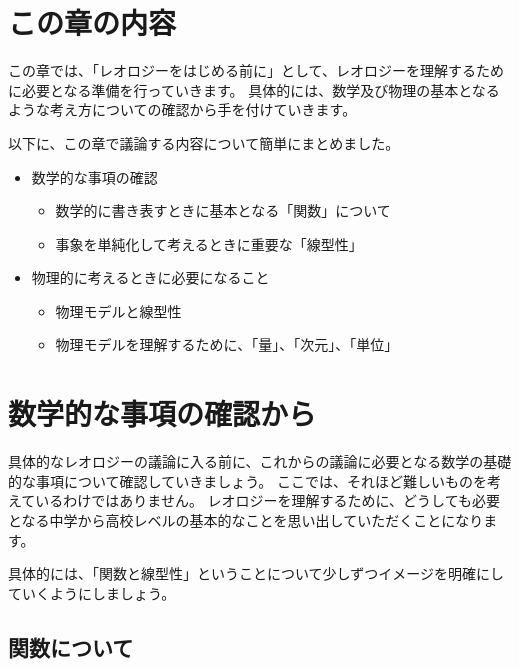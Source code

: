 \documentclass[uplatex,dvipdfmx,a4paper,11pt]{jsarticle}
\begin{document}
\section*{この章の内容}

この章では、「レオロジーをはじめる前に」として、レオロジーを理解するために必要となる準備を行っていきます。
具体的には、数学及び物理の基本となるような考え方についての確認から手を付けていきます。

以下に、この章で議論する内容について簡単にまとめました。

	\begin{boxnote}
		\large
		\begin{itemize}
			\item 数学的な事項の確認
			\begin{itemize}
				\item 数学的に書き表すときに基本となる「関数」について
				\item 事象を単純化して考えるときに重要な「線型性」
			\end{itemize}
			\item 物理的に考えるときに必要になること
			\begin{itemize}
				\item 物理モデルと線型性
				\item 物理モデルを理解するために、「量」、「次元」、「単位」
			\end{itemize}
		\end{itemize}
	\end{boxnote}

\section{数学的な事項の確認から}

具体的なレオロジーの議論に入る前に、これからの議論に必要となる数学の基礎的な事項について確認していきましょう。
ここでは、それほど難しいものを考えているわけではありません。
レオロジーを理解するために、どうしても必要となる中学から高校レベルの基本的なことを思い出していただくことになります。

具体的には、「関数と線型性」ということについて少しずつイメージを明確にしていくようにしましょう。

\subsection{関数について}
\end{document}
